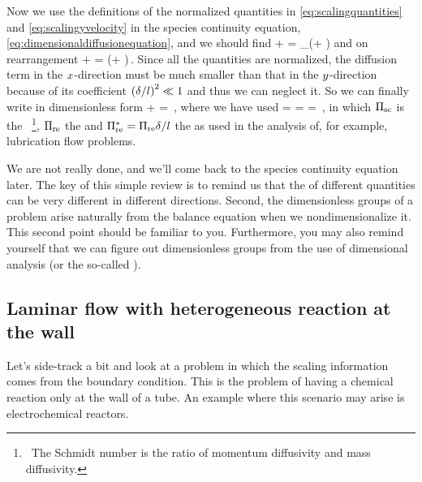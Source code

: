 Now we use the definitions of the normalized quantities in \cref{eq:scalingquantities} and \cref{eq:scalingyvelocity} in the species continuity equation, \cref{eq:dimensionaldiffusionequation}, and we should find
\beq
\dfrac{\fsvel}{\length}\ndvelx\xpd\ndconc\ndposx + \dfrac{\fsvel\blthck}{\blthck\length}\ndvely\xpd\conc\ndposy =
\kmdiff_\left(\conc\ndposx + \conc\ndposy\right)
\eeq
and on rearrangement
\beq
\ndvelx\xpd\conc\ndposx + \ndvely\xpd\conc\ndposy =
\left(\conc\ndposx + \conc\ndposy\right)\,.
\eeq
Since all the quantities are normalized, the diffusion term in the $x$-direction must be much smaller than that in the $y$-direction because of its coefficient $\left(\delta/l\right)^2\ll 1$ and thus we can neglect it. So we can finally write in dimensionless form
\bneq\label{eq:dimlessspeciescontinuity}
\ndvelx\xpd\conc\ndposx + \ndvely\xpd\conc\ndposy = \conc\ndposy\,,
\eneq
where we have used
\beq
{} = 
\dfrac{\kvisc}{\fsvel\blthck}\dfrac{\length}{\blthck} =
\dfrac{\length}{\blthck} = 
\,,
\eeq
in which $\Pi_\text{sc}$ is the ~\footnote{~The Schmidt number is the ratio of momentum diffusivity and mass diffusivity.}, $\Pi_\text{re}$ the  and $\Pi^*_\text{re} = \Pi_\text{re}\delta/l$ the  as used in the analysis of, for example, lubrication flow problems.

We are not really done, and we'll come back to the species continuity equation later. The key of this simple review is to remind us that the  of different quantities can be very different in different directions. Second, the dimensionless groups of a problem arise naturally from the balance equation when we nondimensionalize it. This second point should be familiar to you. Furthermore, you may also remind yourself that we can figure out dimensionless groups from the use of dimensional analysis (or the so-called ).


\subsection{Laminar flow with heterogeneous reaction at the wall}
Let's side-track a bit and look at a problem in which the scaling information comes from the boundary condition. This is the problem of having a chemical reaction only at the wall of a tube. An example where this scenario may arise is electrochemical reactors.

